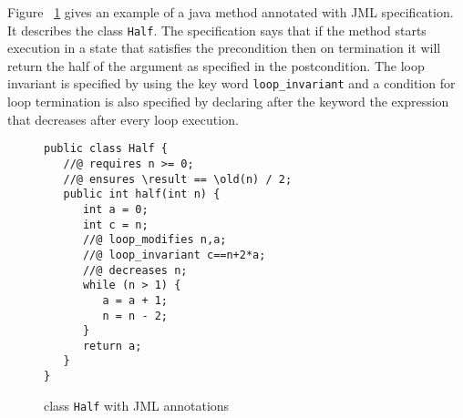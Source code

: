 Figure ~\ref{halfSrc} gives an example of a java method annotated with JML specification.
It describes the class \texttt{Half}.
The specification says that if the method starts execution in a state that satisfies the precondition then on termination it will return the half of the argument as specified in the postcondition. The loop invariant is specified by using the key word \texttt{loop\_invariant} and a condition for loop termination is also specified by declaring after the keyword  the expression that decreases after every loop execution. 
\begin{figure}
\begin{verbatim}
public class Half {	
   //@ requires n >= 0;
   //@ ensures \result == \old(n) / 2; 	 
   public int half(int n) {
      int a = 0;
      int c = n;
      //@ loop_modifies n,a;
      //@ loop_invariant c==n+2*a;
      //@ decreases n;
      while (n > 1) {
         a = a + 1;
         n = n - 2;
      }
      return a;
   }
} 
\end{verbatim}
\caption{class \texttt{Half} with JML annotations} 
\label{halfSrc}
\end{figure}
